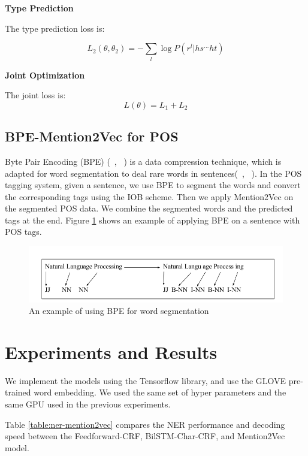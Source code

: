 \documentclass{sfuthesis}
\begin{document}
\textbf{Type Prediction}

The type prediction loss is:

\begin{equation}
  L_{2}\left( \theta ,\theta _{2}\right) =-\sum _{l}\log P\left( r^{l}|hs^{\ldots }ht\right)
\end{equation}

\textbf{Joint Optimization}

The joint loss is:
\begin{equation}
  L\left( \theta \right) =L_{1}+L_{2}  
\end{equation}

\subsection{BPE-Mention2Vec for POS}
Byte Pair Encoding (BPE) (~\citeauthor{gage1994new}, ~\citeyear{gage1994new}) is a data compression technique, which is adapted for word segmentation to deal rare words in sentences(~\citeauthor{sennrich2015neural}, ~\citeyear{sennrich2015neural}). In the POS tagging system, given a sentence, we use BPE to segment the words and convert the corresponding tags using the IOB scheme. Then we apply Mention2Vec on the segmented POS data. We combine the segmented words and the predicted tags at the end. Figure \ref{fig:bpe} shows an example of applying BPE on a sentence with POS tags. 

\begin{figure}
  \centering
  \includegraphics[scale=0.6]{bpe.png}
 \caption{An example of using BPE for word segmentation}
  \label{fig:bpe}
\end{figure}

\section{Experiments and Results}

We implement the models using the Tensorflow library, and use the GLOVE pre-trained word embedding. We used the same set of hyper parameters and the same GPU used in the previous experiments. 

Table \ref{table:ner-mention2vec} compares the NER performance and decoding speed between the Feedforward-CRF, BilSTM-Char-CRF, and Mention2Vec model.
\end{document}
